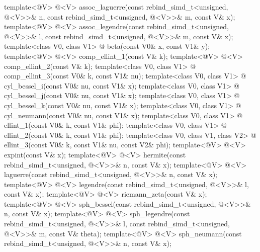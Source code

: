 \begin{itemdecl}
template<@\mathfloatingpoint@ V>
  @\deducedsimd@<V> assoc_laguerre(const rebind_simd_t<unsigned, @\deducedsimd@<V>>& n, const
    rebind_simd_t<unsigned, @\deducedsimd@<V>>& m,
                   const V& x);
template<@\mathfloatingpoint@ V>
  @\deducedsimd@<V> assoc_legendre(const rebind_simd_t<unsigned, @\deducedsimd@<V>>& l, const
    rebind_simd_t<unsigned, @\deducedsimd@<V>>& m,
                   const V& x);
template<class V0, class V1>
  @ beta(const V0& x, const V1& y);
template<@\mathfloatingpoint@ V> @\deducedsimd@<V> comp_ellint_1(const V& k);
template<@\mathfloatingpoint@ V> @\deducedsimd@<V> comp_ellint_2(const V& k);
template<class V0, class V1>
  @ comp_ellint_3(const V0& k, const V1& nu);
template<class V0, class V1>
  @ cyl_bessel_i(const V0& nu, const V1& x);
template<class V0, class V1>
  @ cyl_bessel_j(const V0& nu, const V1& x);
template<class V0, class V1>
  @ cyl_bessel_k(const V0& nu, const V1& x);
template<class V0, class V1>
  @ cyl_neumann(const V0& nu, const V1& x);
template<class V0, class V1>
  @ ellint_1(const V0& k, const V1& phi);
template<class V0, class V1>
  @ ellint_2(const V0& k, const V1& phi);
template<class V0, class V1, class V2>
  @ ellint_3(const V0& k, const V1& nu, const V2& phi);
template<@\mathfloatingpoint@ V> @\deducedsimd@<V> expint(const V& x);
template<@\mathfloatingpoint@ V> @\deducedsimd@<V> hermite(const rebind_simd_t<unsigned,
@\deducedsimd@<V>>& n, const V& x);
template<@\mathfloatingpoint@ V> @\deducedsimd@<V> laguerre(const rebind_simd_t<unsigned,
@\deducedsimd@<V>>& n, const V& x);
template<@\mathfloatingpoint@ V> @\deducedsimd@<V> legendre(const rebind_simd_t<unsigned,
@\deducedsimd@<V>>& l, const V& x);
template<@\mathfloatingpoint@ V> @\deducedsimd@<V> riemann_zeta(const V& x);
template<@\mathfloatingpoint@ V> @\deducedsimd@<V> sph_bessel(const rebind_simd_t<unsigned,
@\deducedsimd@<V>>& n, const V& x);
template<@\mathfloatingpoint@ V>
  @\deducedsimd@<V> sph_legendre(const rebind_simd_t<unsigned, @\deducedsimd@<V>>& l,
                                 const rebind_simd_t<unsigned, @\deducedsimd@<V>>& m,
                                 const V& theta);
template<@\mathfloatingpoint@ V> @\deducedsimd@<V> sph_neumann(const rebind_simd_t<unsigned,
@\deducedsimd@<V>>& n, const V& x);
\end{itemdecl}
